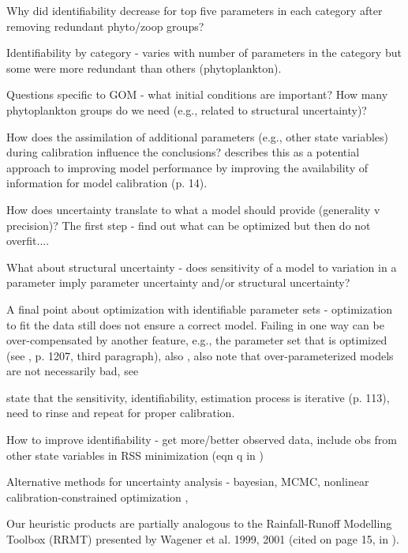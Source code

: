 \documentclass[letterpaper,12pt,oneside]{article}\usepackage[]{graphicx}\usepackage[]{color}
\begin{document}
Why did identifiability decrease for top five parameters in each category after removing redundant phyto/zoop groups?

Identifiability by category - varies with number of parameters in the category but some were more redundant than others (phytoplankton).  

Questions specific to GOM - what initial conditions are important? How many phytoplankton groups do we need (e.g., related to structural uncertainty)?

How does the assimilation of additional parameters (e.g., other state variables) during calibration influence the conclusions?  \citet{Wagener01} describes this as a potential approach to improving model performance by improving the availability of information for model calibration (p. 14).  

How does uncertainty translate to what a model should provide (generality v precision)?  The first step - find out what can be optimized but then do not overfit....

What about structural uncertainty - does sensitivity of a model to variation in a parameter imply parameter uncertainty and/or structural uncertainty?

A final point about optimization with identifiable parameter sets - optimization to fit the data still does not ensure a correct model.  Failing in one way can be over-compensated by another feature, e.g., the parameter set that is optimized (see \cite{Flynn05}, p. 1207, third paragraph), also \citep{Arhonditsis08}, also note that over-parameterized models are not necessarily bad, see \citep{Omlin01}

\cite{Omlin01} state that the sensitivity, identifiability, estimation process is iterative (p. 113), need to rinse and repeat for proper calibration. 

How to improve identifiability - get more/better observed data, include obs from other state variables in RSS minimization (eqn q in \cite{Omlin01})

Alternative methods for uncertainty analysis - bayesian, MCMC, nonlinear calibration-constrained optimization \citep{Gallagher07}, \citep{Arhonditsis08}

Our heuristic products are partially analogous to the Rainfall-Runoff Modelling Toolbox (RRMT) presented by Wagener et al. 1999, 2001 (cited on page 15, in \citealt{Wagener01}).

\clearpage
\begin{singlespace}


\end{singlespace}
\clearpage
\end{document}
